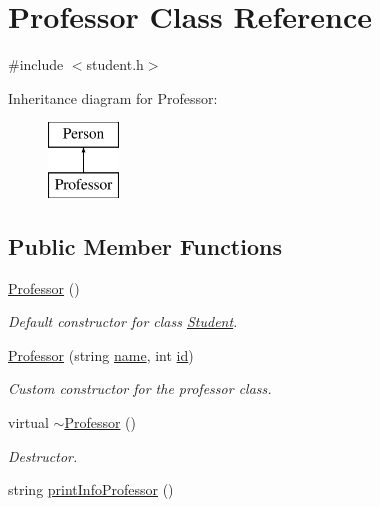\hypertarget{class_professor}{}\section{Professor Class Reference}
\label{class_professor}


{\ttfamily \#include $<$student.\+h$>$}

Inheritance diagram for Professor\+:\begin{figure}[H]
\begin{center}
\leavevmode
\includegraphics[height=2.000000cm]{class_professor}
\end{center}
\end{figure}
\subsection*{Public Member Functions}
\begin{DoxyCompactItemize}
\item 
\hyperlink{class_professor_ac6d4e54caf399a841888e60b54eed4c3}{Professor} ()
\begin{DoxyCompactList}\small\item\em Default constructor for class \hyperlink{class_student}{Student}. \end{DoxyCompactList}\item 
\hyperlink{class_professor_ac264bd1b8657897edf63ecb535315ab7}{Professor} (string \hyperlink{class_person_a669b64897b4d823a27bb5866368d4dfa}{name}, int \hyperlink{class_person_aec48a92f614a854ff380a15eb8e2f479}{id})
\begin{DoxyCompactList}\small\item\em Custom constructor for the professor class. \end{DoxyCompactList}\item 
virtual \hyperlink{class_professor_ac3b5cfd3e0016f25f4c2c194ccd593d8}{$\sim$\+Professor} ()
\begin{DoxyCompactList}\small\item\em Destructor. \end{DoxyCompactList}\item 
string \hyperlink{class_professor_ab82335224aa182146ec08b3f9cc4e2b4}{print\+Info\+Professor} ()
\end{DoxyCompactItemize}
